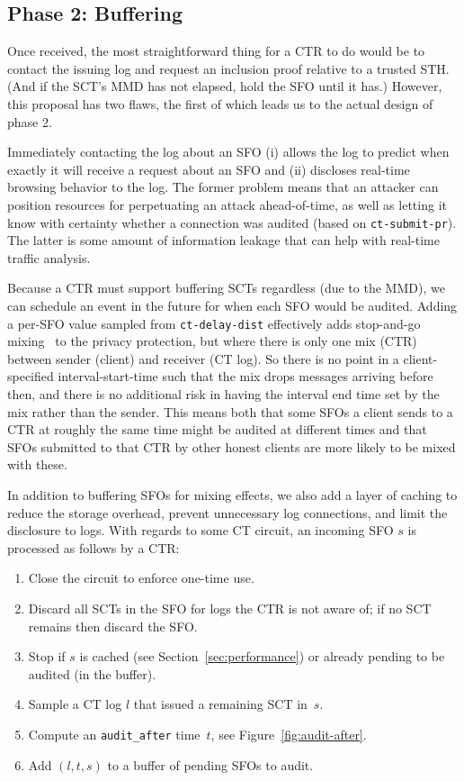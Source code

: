 \subsection{Phase 2: Buffering} \label{sec:base:phase2}

Once received, the most straightforward thing for a CTR to do would be to
contact the issuing log and request an inclusion proof relative to a trusted
STH\@. (And if the SCT's MMD has not elapsed, hold the SFO until it has.)
However, this proposal has two flaws, the first of which leads us to the actual
design of phase 2.

Immediately contacting the log about an SFO (i) allows the log to predict when
exactly it will receive a request about an SFO and (ii) discloses real-time
browsing behavior to the log. The former problem means that an attacker can
position resources for perpetuating an attack ahead-of-time, as well as letting
it know with certainty whether a connection was audited (based on
\texttt{ct-submit-pr}). The latter is some amount of information leakage that
can help with real-time traffic analysis.

Because a CTR must support buffering SCTs regardless (due to the MMD), we can
schedule an event in the future for when each SFO would be audited. Adding a
per-SFO value sampled from \texttt{ct-delay-dist} effectively adds stop-and-go
mixing~\cite{kesdogan:ih1998} to the privacy protection, but where there is only
one mix (CTR) between sender (client) and receiver (CT log). So there is no
point in a client-specified interval-start-time such that the mix drops messages
arriving before then, and there is no additional risk in having the interval end
time set by the mix rather than the sender. This means both that some SFOs a
client sends to a CTR at roughly the same time might be audited at different
times and that SFOs submitted to that CTR by other honest clients are more
likely to be mixed with these.

In addition to buffering SFOs for mixing effects, we also add a layer of caching
to reduce the storage overhead, prevent unnecessary log connections, and limit
the disclosure to logs. With regards to some CT circuit, an incoming SFO $s$ is
processed as follows by a CTR:
\begin{enumerate}
    \item\label{enm:storage:close} Close the circuit to enforce one-time use.
    \item\label{enm:storage:unrecognized} Discard all SCTs in the SFO for logs
        the CTR is not aware of; if no SCT remains then discard the SFO\@.
    \item\label{enm:storage:cached} Stop if $s$ is cached (see
        Section~\ref{sec:performance}) or already pending to be audited (in the
        buffer).
    \item\label{enm:storage:fix-log} Sample a CT log $l$ that issued a
        remaining SCT in~$s$.
    \item\label{enm:storage:audit-after} Compute an \texttt{audit\_after}
		time~$t$, see Figure~\ref{fig:audit-after}.
    \item\label{enm:storage:store} Add $(l,t,s)$ to a buffer of pending SFOs to
    audit.
\end{enumerate}

